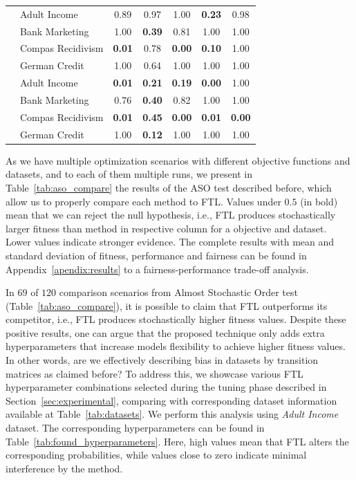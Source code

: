 \begin{table}[ht]
{\begin{tabular}{llccccc}
 & Adult Income & 0.89 & 0.97 & 1.00 & \textbf{0.23} & 0.98 \\
 & Bank Marketing & 1.00 & \textbf{0.39} & 0.81 & 1.00 & 1.00 \\
 & Compas Recidivism & \textbf{0.01} & 0.78 & \textbf{0.00} & \textbf{0.10} & 1.00 \\
 & German Credit & 1.00 & 0.64 & 1.00 & 1.00 & 1.00 \vspace{1ex}\\

 & Adult Income & \textbf{0.01} & \textbf{0.21} & \textbf{0.19} & \textbf{0.00} & 1.00 \\
 & Bank Marketing & 0.76 & \textbf{0.40} & 0.82 & 1.00 & 1.00 \\
 & Compas Recidivism & \textbf{0.01} & \textbf{0.45} & \textbf{0.00} & \textbf{0.01} & \textbf{0.00} \\
 & German Credit & 1.00 & \textbf{0.12} & 1.00 & 1.00 & 1.00 \\

\bottomrule
\end{tabular}


    }
\end{table}

As we have multiple optimization scenarios with different objective functions and datasets, and to each of them multiple runs, we present in Table~\ref{tab:aso_compare} the results of the ASO test described before, which allow us to properly compare each method to FTL. Values under $0.5$ (in bold) mean that we can reject the null hypothesis, i.e., FTL produces stochastically larger fitness than method in respective column for a objective and dataset. Lower values indicate stronger evidence. The complete results with mean and standard deviation of fitness, performance and fairness can be found in Appendix~\ref{apendix:results} to a fairness-performance trade-off analysis.

In $69$ of $120$ comparison scenarios from Almost Stochastic Order test (Table~\ref{tab:aso_compare}), it is possible to claim that FTL outperforms its competitor, i.e., FTL produces stochastically higher fitness values. Despite these positive results, one can argue that the proposed technique only adds extra hyperparameters that increase models flexibility to achieve higher fitness values. In other words, are we effectively describing bias in datasets by transition matrices as claimed before? To address this, we showcase various FTL hyperparameter combinations selected during the tuning phase described in Section~\ref{sec:experimental}, comparing with corresponding dataset information available at Table~\ref{tab:datasets}. We perform this analysis using \textit{Adult Income} dataset. The corresponding hyperparameters can be found in Table~\ref{tab:found_hyperparameters}. Here, high values mean that FTL alters the corresponding probabilities, while values close to zero indicate minimal interference by the method.


